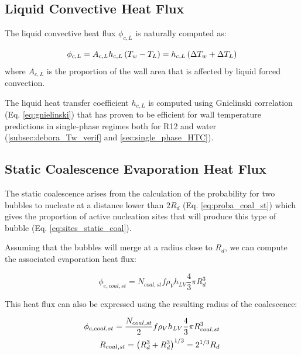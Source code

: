 \npar


\subsection{Liquid Convective Heat Flux}

The liquid convective heat flux $\phi_{c,L}$ is naturally computed as:

\begin{equation}
\phi_{c,L} = A_{c,L}h_{c,L}\left( T_{w}-T_{L} \right) = h_{c,L}\left( \Delta T_{w} + \Delta T_{L} \right)
\end{equation}
where $A_{c,L}$ is the proportion of the wall area that is affected by liquid forced convection.

\npar

The liquid heat transfer coefficient $h_{c,L}$ is computed using Gnielinski correlation (Eq. \ref{eq:gnielinski}) that has proven to be efficient for wall temperature predictions in single-phase regimes both for R12 and water (\ref{subsec:debora_Tw_verif} and \ref{sec:single_phase_HTC}). 

\subsection{Static Coalescence Evaporation Heat Flux}

The static coalescence arises from the calculation of the probability for two bubbles to nucleate at a distance lower than $2R_{d}$ (Eq. \ref{eq:proba_coal_st}) which gives the proportion of active nucleation sites that will produce this type of bubble (Eq. \ref{eq:sites_static_coal}). 

\npar

Assuming that the bubbles will merge at a radius close to $R_{d}$, we can compute the associated evaporation heat flux:

\begin{equation}
\phi_{e,coal,st} = N_{coal,st} f \rho_{V} h_{LV} \frac{4}{3}\pi R_{d}^{3}
\end{equation}

This heat flux can also be expressed using the resulting radius of the coalescence:

\begin{align}
\phi_{e,coal,st} = \frac{N_{coal,st}}{2} f \rho_{V} h_{LV} \frac{4}{3}\pi R_{coal,st}^{3}\\
R_{coal,st} = \left( R_{d}^{3}+R_{d}^{3} \right)^{1/3} = 2^{1/3}R_{d}
\end{align}


